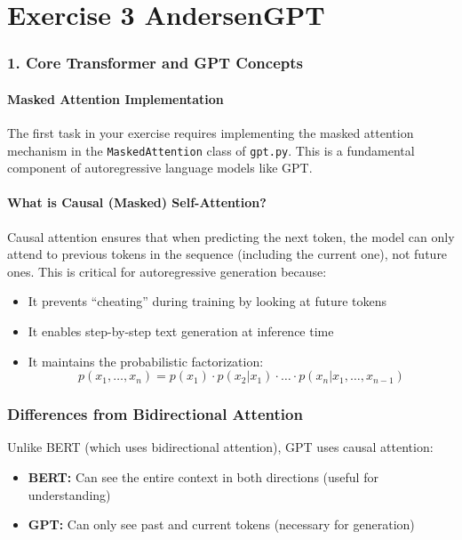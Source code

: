 \chapter{\normalsize Exercise 3 AndersenGPT}

\subsection*{1. Core Transformer and GPT Concepts}

\subsubsection*{Masked Attention Implementation}
The first task in your exercise requires implementing the masked attention mechanism in the \texttt{MaskedAttention} class of \texttt{gpt.py}. This is a fundamental component of autoregressive language models like GPT.

\subsubsection*{What is Causal (Masked) Self-Attention?}
Causal attention ensures that when predicting the next token, the model can only attend to previous tokens in the sequence (including the current one), not future ones. This is critical for autoregressive generation because:

\begin{itemize}
    \item It prevents \textquotedblleft cheating\textquotedblright{} during training by looking at future tokens
    \item It enables step-by-step text generation at inference time
    \item It maintains the probabilistic factorization: 
    $$
    p(x_1, \dots, x_n) = p(x_1) \cdot p(x_2|x_1) \cdot \dots \cdot p(x_n|x_1,\dots,x_{n-1})
    $$
\end{itemize}
\subsection*{Differences from Bidirectional Attention}

Unlike BERT (which uses bidirectional attention), GPT uses causal attention:

\begin{itemize}
    \item \textbf{BERT:} Can see the entire context in both directions (useful for understanding)
    \item \textbf{GPT:} Can only see past and current tokens (necessary for generation)
\end{itemize}

